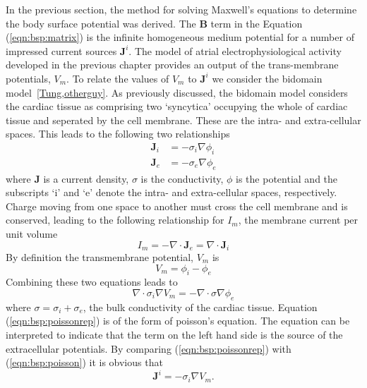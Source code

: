 In the previous section, the method for solving Maxwell's equations to determine
the body surface potential was derived.
The $\mathbf{B}$ term in the Equation (\ref{eqn:bsp:matrix}) is the infinite
homogeneous medium potential for a number of impressed current sources
$\mathbf{J}^i$.
The model of atrial electrophysiological activity developed in the previous
chapter provides an output of the trans-membrane potentials, $V_m$.
To relate the values of $V_m$ to $\mathbf{J}^i$ we consider the bidomain
model~\ref{Tung,otherguy}.
As previously discussed, the bidomain model considers the cardiac tissue as
comprising two `syncytica' occupying the whole of cardiac tissue and seperated
by the cell membrane.
These are the intra- and extra-cellular spaces.
This leads to the following two relationships
\begin{align}
\label{eqn:bsp:bidomaini}
\mathbf{J}_i & = -\sigma_i \nabla \phi_i \\
\label{eqn:bsp:bidomaine}
\mathbf{J}_e & = -\sigma_e \nabla \phi_e
\end{align}
where $\mathbf{J}$ is a current density, $\sigma$ is the conductivity, $\phi$
is the potential and the subscripts `i' and `e' denote the intra- and
extra-cellular spaces, respectively.
Charge moving from one space to another must cross the cell membrane and is
conserved, leading to the following relationship for $I_m$, the membrane current per unit
volume
\begin{equation}
\label{eqn:bsp:im}
I_m = -\nabla\cdot\mathbf{J}_e = \nabla\cdot\mathbf{J}_i
\end{equation}
By definition the transmembrane potential, $V_m$ is
\begin{equation}
\label{eqn:bsp:tmp}
V_m = \phi_i - \phi_e
\end{equation}
Combining these two equations leads to
\begin{equation}
\label{eqn:bsp:poissonrep}
\nabla\cdot\sigma_i\nabla V_m = -\nabla\cdot\sigma\nabla\phi_e
\end{equation}
where $\sigma = \sigma_i + \sigma_e$, the bulk conductivity of the cardiac
tissue.
Equation (\ref{eqn:bsp:poissonrep}) is of the form of poisson's equation.
The equation can be interpreted to indicate that the term on the left hand side
is the source of the extracellular potentials.
By comparing (\ref{eqn:bsp:poissonrep}) with (\ref{eqn:bsp:poisson}) it is
obvious that
\begin{equation}
\label{eqn:bsp:ji}
\mathbf{J}^i = -\sigma_i\nabla V_m.
\end{equation}

